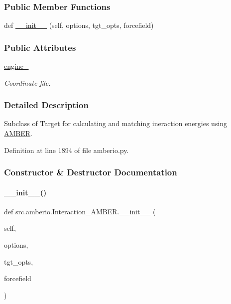 \subsubsection*{Public Member Functions}
\begin{DoxyCompactItemize}
\item 
def \hyperlink{classsrc_1_1amberio_1_1Interaction__AMBER_ac1a0d7241be581712feee70194515f0b}{\+\_\+\+\_\+init\+\_\+\+\_\+} (self, options, tgt\+\_\+opts, forcefield)
\end{DoxyCompactItemize}
\subsubsection*{Public Attributes}
\begin{DoxyCompactItemize}
\item 
\hyperlink{classsrc_1_1amberio_1_1Interaction__AMBER_a4fc0bf1dde7b006b07dbb0f09efb297f}{engine\+\_\+}
\begin{DoxyCompactList}\small\item\em Coordinate file. \end{DoxyCompactList}\end{DoxyCompactItemize}


\subsubsection{Detailed Description}
Subclass of Target for calculating and matching ineraction energies using \hyperlink{classsrc_1_1amberio_1_1AMBER}{A\+M\+B\+ER}. 



Definition at line 1894 of file amberio.\+py.



\subsubsection{Constructor \& Destructor Documentation}
\mbox{\label{classsrc_1_1amberio_1_1Interaction__AMBER_ac1a0d7241be581712feee70194515f0b}} 
\paragraph{\texorpdfstring{\+\_\+\+\_\+init\+\_\+\+\_\+()}{\_\_init\_\_()}}
{\footnotesize\ttfamily def src.\+amberio.\+Interaction\+\_\+\+A\+M\+B\+E\+R.\+\_\+\+\_\+init\+\_\+\+\_\+ (\begin{DoxyParamCaption}\item[{}]{self,  }\item[{}]{options,  }\item[{}]{tgt\+\_\+opts,  }\item[{}]{forcefield }\end{DoxyParamCaption})}



